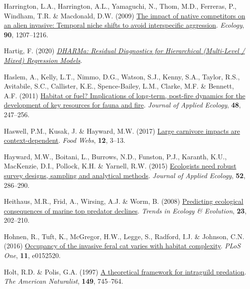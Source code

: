 \documentclass[11pt,a4paper,titlepage,twoside,openright]{style/unimelbthesis}
\newenvironment{CSLReferences}%
  {}%
  {\par}
\begin{document}
\begin{mainmatter}
\begin{CSLReferences}{1}{0}
\leavevmode{}%
Harrington, L.A., Harrington, A.L., Yamaguchi, N., Thom, M.D., Ferreras, P., Windham, T.R. \& Macdonald, D.W. (2009) \href{https://doi.org/10.1890/08-0302.1}{The impact of native competitors on an alien invasive: Temporal niche shifts to avoid interspecific aggression}. \emph{Ecology}, \textbf{90}, 1207--1216.

\leavevmode{}%
Hartig, F. (2020) \emph{\href{https://CRAN.R-project.org/package=DHARMa}{DHARMa: Residual Diagnostics for Hierarchical (Multi-Level / Mixed) Regression Models}}.

\leavevmode{}%
Haslem, A., Kelly, L.T., Nimmo, D.G., Watson, S.J., Kenny, S.A., Taylor, R.S., Avitabile, S.C., Callister, K.E., Spence-Bailey, L.M., Clarke, M.F. \& Bennett, A.F. (2011) \href{https://doi.org/10.1111/j.1365-2664.2010.01906.x}{Habitat or fuel? Implications of long-term, post-fire dynamics for the development of key resources for fauna and fire}. \emph{Journal of Applied Ecology}, \textbf{48}, 247--256.

\leavevmode{}%
Haswell, P.M., Kusak, J. \& Hayward, M.W. (2017) \href{https://doi.org/10.1016/j.fooweb.2016.02.005}{Large carnivore impacts are context-dependent}. \emph{Food Webs}, \textbf{12}, 3--13.

\leavevmode{}%
Hayward, M.W., Boitani, L., Burrows, N.D., Funston, P.J., Karanth, K.U., MacKenzie, D.I., Pollock, K.H. \& Yarnell, R.W. (2015) \href{https://doi.org/10.1111/1365-2664.12408}{Ecologists need robust survey designs, sampling and analytical methods}. \emph{Journal of Applied Ecology}, \textbf{52}, 286--290.

\leavevmode{}%
Heithaus, M.R., Frid, A., Wirsing, A.J. \& Worm, B. (2008) \href{https://doi.org/10.1016/j.tree.2008.01.003}{Predicting ecological consequences of marine top predator declines}. \emph{Trends in Ecology \& Evolution}, \textbf{23}, 202--210.

\leavevmode{}%
Hohnen, R., Tuft, K., McGregor, H.W., Legge, S., Radford, I.J. \& Johnson, C.N. (2016) \href{https://doi.org/10.1371/journal.pone.0152520}{Occupancy of the invasive feral cat varies with habitat complexity}. \emph{PLoS One}, \textbf{11}, e0152520.

\leavevmode{}%
Holt, R.D. \& Polis, G.A. (1997) \href{https://doi.org/10.1086/286018}{A theoretical framework for intraguild predation}. \emph{The American Naturalist}, \textbf{149}, 745--764.


\end{CSLReferences}
\end{mainmatter}
\end{document}
